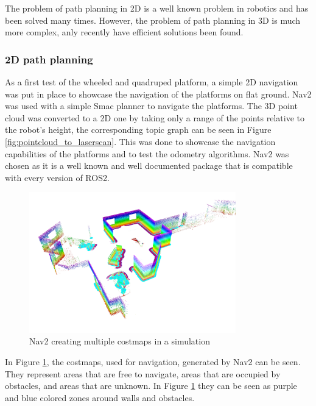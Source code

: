 \documentclass[11pt]{article}
\begin{document}
        The problem of path planning in 2D is a well known problem in robotics and has been solved many times. However, the problem of path planning in 3D is much more complex, anly recently have efficient solutions been found. 

        \subsubsection{2D path planning}
        As a first test of the wheeled and quadruped platform, a simple 2D navigation was put in place to showcase the navigation of the platforms on flat ground. Nav2 \cite{macenski2020marathon2} was used with a simple Smac planner \cite{macenski2024smac} to navigate the platforms. The 3D point cloud was converted to a 2D one by taking only a range of the points relative to the robot's height, the corresponding topic graph can be seen in Figure \ref{fig:pointcloud_to_laserscan}. This was done to showcase the navigation capabilities of the platforms and to test the odometry algorithms. Nav2 was chosen as it is a well known and well documented package that is compatible with every version of ROS2. 
                
        \begin{figure}[H]
            \centering
            \label{fig:nav2_costmaps}
            \includegraphics[width=0.8\textwidth]{Images/nav2_costmaps_alpha.png}
            \caption{Nav2 creating multiple costmaps in a simulation}
        \end{figure}
        
        In Figure \ref{fig:nav2_costmaps}, the costmaps, used for navigation, generated by Nav2 can be seen. They represent areas that are free to navigate, areas that are occupied by obstacles, and areas that are unknown. In Figure \ref{fig:nav2_costmaps} they can be seen as purple and blue colored zones around walls and obstacles.  
\end{document}
